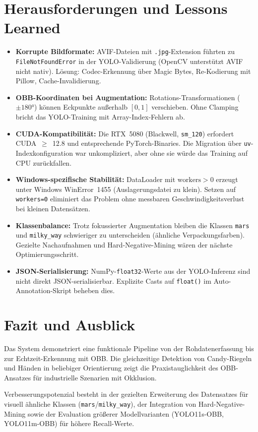 \documentclass[a4paper, 11pt]{scrartcl}
\begin{document}
\section{Herausforderungen und Lessons Learned}

\begin{itemize}
    \item \textbf{Korrupte Bildformate:} AVIF-Dateien mit \texttt{.jpg}-Extension führten zu \texttt{FileNotFoundError} in der YOLO-Validierung (OpenCV unterstützt AVIF nicht nativ).
    Lösung: Codec-Erkennung über Magic Bytes, Re-Kodierung mit Pillow, Cache-Invalidierung.
    \item \textbf{OBB-Koordinaten bei Augmentation:} Rotations-Transformationen ($\pm 180°$) können Eckpunkte außerhalb $[0,1]$ verschieben.
    Ohne Clamping bricht das YOLO-Training mit Array-Index-Fehlern ab.
    \item \textbf{CUDA-Kompatibilität:} Die RTX~5080 (Blackwell, \texttt{sm\_120}) erfordert CUDA~$\geq$~12.8 und entsprechende PyTorch-Binaries.
    Die Migration über \texttt{uv}-Indexkonfiguration war unkompliziert, aber ohne sie würde das Training auf CPU zurückfallen.
    \item \textbf{Windows-spezifische Stabilität:} DataLoader mit $\text{workers} > 0$ erzeugt unter Windows WinError~1455 (Auslagerungsdatei zu klein).
    Setzen auf \texttt{workers=0} eliminiert das Problem ohne messbaren Geschwindigkeitsverlust bei kleinen Datensätzen.
    \item \textbf{Klassenbalance:} Trotz fokussierter Augmentation bleiben die Klassen \texttt{mars} und \texttt{milky\_way} schwieriger zu unterscheiden (ähnliche Verpackungsfarben).
    Gezielte Nachaufnahmen und Hard-Negative-Mining wären der nächste Optimierungsschritt.
    \item \textbf{JSON-Serialisierung:} NumPy-\texttt{float32}-Werte aus der YOLO-Inferenz sind nicht direkt JSON-serialisierbar.
    Explizite Casts auf \texttt{float()} im Auto-Annotation-Skript beheben dies.
\end{itemize}

\section{Fazit und Ausblick}

Das System demonstriert eine funktionale Pipeline von der Rohdatenerfassung bis zur Echtzeit-Erkennung mit OBB.
Die gleichzeitige Detektion von Candy-Riegeln und Händen in beliebiger Orientierung zeigt die Praxistauglichkeit des OBB-Ansatzes für industrielle Szenarien mit Okklusion.

Verbesserungspotenzial besteht in der gezielten Erweiterung des Datensatzes für visuell ähnliche Klassen (\texttt{mars}/\texttt{milky\_way}), der Integration von Hard-Negative-Mining sowie der Evaluation größerer Modellvarianten (YOLO11s-OBB, YOLO11m-OBB) für höhere Recall-Werte.



\end{document}
